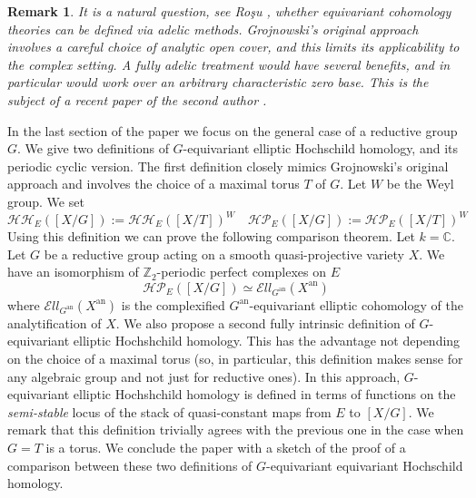 \documentclass[11pt,letterpaper]{amsart}
\newenvironment{customthm}[1]
{\renewcommand\theinnercustomthm{#1}\innercustomthm}
  {\endinnercustomthm}
\newtheorem{remark}[dummy]{Remark}
\newcommand{\bC}{\mathbb{C}}
\newcommand{\bZ}{\mathbb{Z}}
\newcommand{\cHH}{\mathcal{HH}}
\newcommand{\cHP}{\mathcal{HP}}
\newcommand{\El}{\mathcal{E}ll}
\newcommand{\an}{\mathrm{an}}
\begin{document}
\begin{remark}
It is a natural question, see Ro\c{s}u \cite{Ros3}, whether  equivariant cohomology theories can be defined via adelic methods. Grojnowski's original approach involves a careful choice of analytic open cover, and this limits its applicability to the complex setting. A fully adelic treatment would have several benefits, and in particular would work over an arbitrary characteristic zero base. This is the subject of a recent paper of the second author \cite{EllAd}. 
\end{remark}

In the last section of the paper we  focus on the general case of a reductive group  $G$. We give two definitions of $G$-equivariant elliptic Hochschild homology, and its periodic cyclic version. The first definition closely mimics Grojnowski's original approach and  involves the choice of a maximal torus $T$ of $G$. Let $W$ be the Weyl group. We set
$$\cHH_E([X/G]):=\cHH_E([X/T])^W \quad \cHP_E([X/G]):=\cHP_E([X/T])^W$$
Using this definition we can prove the following comparison theorem.%
\begin{customthm}{H}[Corollary  \ref{cor:comparisonG}]\label{groupGintro}
Let $k=\bC$. Let $G$ be a reductive group acting on a smooth quasi-projective variety $X$.
We have an isomorphism of $\bZ_2$-periodic perfect complexes on $E$
$$\cHP_E([X/G])\simeq\El_{G^{\an}}(X^{\an})$$
where $\El_{G^{\an}}(X^{\an})$ is  the complexified $G^{\an}$-equivariant elliptic cohomology of the analytification of $X$.  \end{customthm}
We also propose a second fully intrinsic definition of 
$G$-equivariant elliptic Hochshchild homology. This has the advantage not depending on the choice of a maximal torus (so, in particular, this definition makes sense for any algebraic group and not just for reductive ones). In this approach, $G$-equivariant elliptic Hochshchild homology is defined in terms of functions on the \emph{semi-stable} locus of the stack of quasi-constant maps from $E$ to $[X/G]$. We remark that this definition trivially agrees with the previous one in the case when $G=T$ is a torus. We conclude the paper with a sketch of the  proof of a comparison between these two definitions of  $G$-equivariant equivariant Hochschild homology. %
\end{document}
